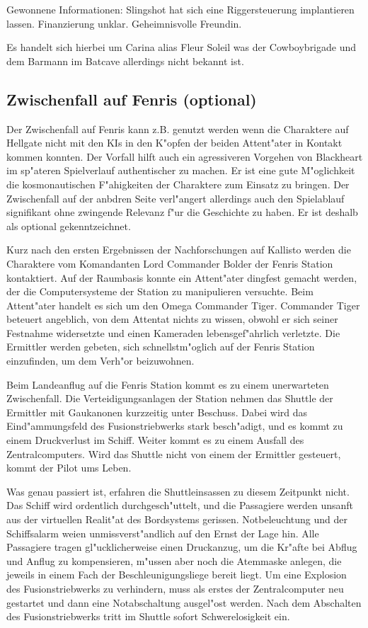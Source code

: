 \begin{remarks}
	Gewonnene Informationen: Slingshot hat sich eine Riggersteuerung implantieren lassen. Finanzierung unklar. Geheimnisvolle Freundin. 
	
	Es handelt sich hierbei um Carina alias Fleur Soleil was der Cowboybrigade und dem Barmann im Batcave allerdings nicht bekannt ist.
\end{remarks}

\subsection{Zwischenfall auf Fenris (optional)}

Der Zwischenfall auf Fenris kann z.B. genutzt werden wenn die Charaktere auf Hellgate nicht mit den KIs in den K"opfen der beiden Attent"ater in Kontakt kommen konnten. Der Vorfall hilft auch ein agressiveren Vorgehen von Blackheart im sp"ateren Spielverlauf authentischer zu machen. Er ist eine gute M"oglichkeit die kosmonautischen F"ahigkeiten der Charaktere zum Einsatz zu bringen. Der Zwischenfall auf der anbdren Seite verl"angert allerdings auch den Spielablauf signifikant ohne zwingende Relevanz f"ur die Geschichte zu haben. Er ist deshalb als optional gekenntzeichnet.

Kurz nach den ersten Ergebnissen der Nachforschungen auf Kallisto werden die Charaktere vom Komandanten Lord Commander Bolder der Fenris Station kontaktiert. Auf der Raumbasis konnte ein Attent"ater dingfest gemacht werden, der die Computersysteme der Station zu manipulieren versuchte. Beim Attent"ater handelt es sich um den Omega Commander Tiger. Commander Tiger beteuert angeblich, von dem Attentat nichts zu wissen, obwohl er sich seiner Festnahme widersetzte und einen Kameraden lebensgef"ahrlich verletzte. Die Ermittler werden gebeten, sich schnellstm"oglich auf der Fenris Station einzufinden, um dem Verh"or beizuwohnen.

Beim Landeanflug auf die Fenris Station kommt es zu einem unerwarteten Zwischenfall. Die Verteidigungsanlagen der Station nehmen das Shuttle der Ermittler mit Gau\3kanonen kurzzeitig unter Beschuss. Dabei wird das Eind"ammungsfeld des Fusionstriebwerks stark besch"adigt, und es kommt zu einem Druckverlust im Schiff. Weiter kommt es zu einem Ausfall des Zentralcomputers. Wird das Shuttle nicht von einem der Ermittler gesteuert, kommt der Pilot ums Leben.

Was genau passiert ist, erfahren die Shuttleinsassen zu diesem Zeitpunkt nicht. Das Schiff wird ordentlich durchgesch"uttelt, und die Passagiere werden unsanft aus der virtuellen Realit"at des Bordsystems gerissen. Notbeleuchtung und der Schiffsalarm wei\3en unmissverst"andlich auf den Ernst der Lage hin. Alle Passagiere tragen gl"ucklicherweise einen Druckanzug, um die Kr"afte bei Abflug und Anflug zu kompensieren, m"ussen aber noch die Atemmaske anlegen, die jeweils in einem Fach der Beschleunigungsliege bereit liegt. Um eine Explosion des Fusionstriebwerks zu verhindern, muss als erstes der Zentralcomputer neu gestartet und dann eine Notabschaltung ausgel"ost werden. Nach dem Abschalten des Fusionstriebwerks tritt im Shuttle sofort Schwerelosigkeit ein.

